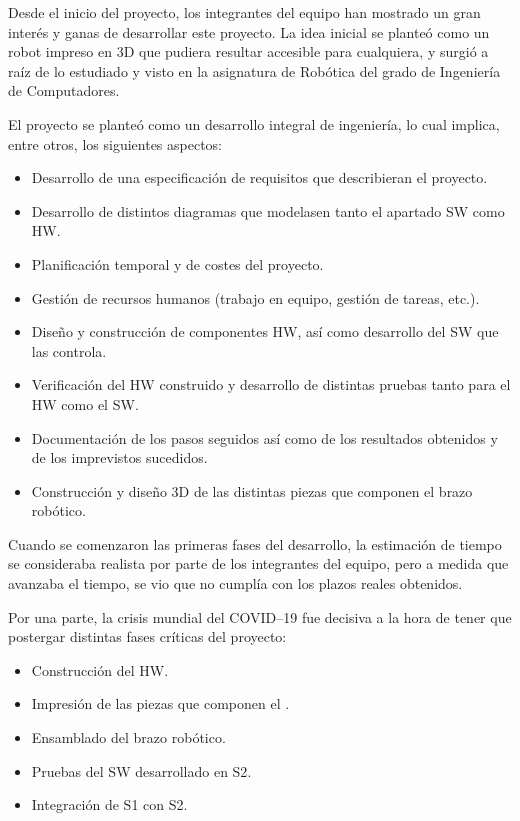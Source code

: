 Desde el inicio del proyecto, los integrantes del equipo han mostrado un gran interés
y ganas de desarrollar este proyecto. La idea inicial se planteó como un robot
impreso en 3D que pudiera resultar accesible para cualquiera, y surgió a raíz de lo estudiado
y visto en la asignatura de Robótica del grado de Ingeniería de Computadores.

El proyecto se planteó como un desarrollo integral de ingeniería, lo cual implica, entre otros, los siguientes aspectos:
\begin{itemize}
    \item Desarrollo de una especificación de requisitos que describieran el proyecto.
    \item Desarrollo de distintos diagramas que modelasen tanto el apartado
    \ac{SW} como \ac{HW}.
    \item Planificación temporal y de costes del proyecto.
    \item Gestión de recursos humanos (trabajo en equipo, gestión de tareas, etc.).
    \item Diseño y construcción de componentes \ac{HW}, así como desarrollo del \ac{SW} que las controla.
    \item Verificación del \ac{HW} construido y desarrollo de distintas pruebas tanto
    para el \ac{HW} como el \ac{SW}.
    \item Documentación de los pasos seguidos así como de los resultados obtenidos
    y de los imprevistos sucedidos.
    \item Construcción y diseño 3D de las distintas piezas que componen el brazo
    robótico.
\end{itemize}

Cuando se comenzaron las primeras fases del desarrollo, la estimación de tiempo
se consideraba realista por parte de los integrantes del equipo, pero a medida
que avanzaba el tiempo, se vio que no cumplía con los plazos reales obtenidos.

Por una parte, la crisis mundial del COVID--19 fue decisiva a la hora de tener que
postergar distintas fases críticas del proyecto:
\begin{itemize}
    \item Construcción del \ac{HW}.
    \item Impresión de las piezas que componen el \pArm{}.
    \item Ensamblado del brazo robótico.
    \item Pruebas del \ac{SW} desarrollado en \ac{S2}.
    \item Integración de \ac{S1} con \ac{S2}.
\end{itemize}

